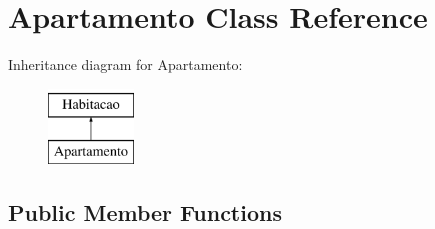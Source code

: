 \hypertarget{class_apartamento}{}\section{Apartamento Class Reference}
\label{class_apartamento}
Inheritance diagram for Apartamento\+:\begin{figure}[H]
\begin{center}
\leavevmode
\includegraphics[height=2.000000cm]{class_apartamento}
\end{center}
\end{figure}
\subsection*{Public Member Functions}
